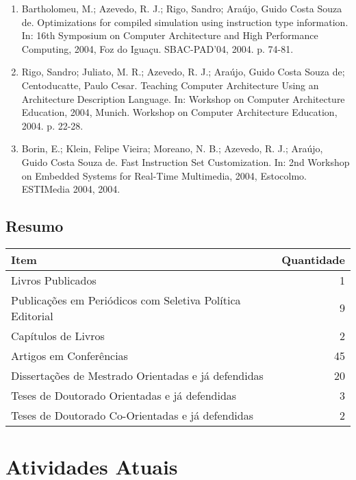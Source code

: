\documentclass[11pt]{article}
\begin{document}
\begin{enumerate}
\item Bartholomeu, M.; Azevedo, R. J.; Rigo, Sandro; Araújo, Guido
  Costa Souza de. Optimizations for compiled simulation using
  instruction type information. In: 16th Symposium on Computer
  Architecture and High Performance Computing, 2004, Foz do
  Iguaçu. SBAC-PAD'04, 2004. p. 74-81.

\item Rigo, Sandro; Juliato, M. R.; Azevedo, R. J.; Araújo, Guido
  Costa Souza de; Centoducatte, Paulo Cesar. Teaching Computer
  Architecture Using an Architecture Description Language. In:
  Workshop on Computer Architecture Education, 2004, Munich. Workshop
  on Computer Architecture Education, 2004. p. 22-28.
  
\item Borin, E.; Klein, Felipe Vieira; Moreano, N. B.; Azevedo, R. J.;
  Araújo, Guido Costa Souza de. Fast Instruction Set
  Customization. In: 2nd Workshop on Embedded Systems for Real-Time
  Multimedia, 2004, Estocolmo. ESTIMedia 2004, 2004.
 
\end{enumerate}

\subsection{Resumo}

\begin{table}[htbp]
  \centering
  \begin{tabular}{|l|r|}
\hline
Item & Quantidade \\ \hline \hline
Livros Publicados & 1 \\ \hline
Publicações em Periódicos com Seletiva Política Editorial & 9 \\
\hline
Capítulos de Livros & 2 \\ \hline
Artigos em Conferências & 45 \\ \hline
Dissertações de Mestrado Orientadas e já defendidas & 20 \\ \hline
Teses de Doutorado Orientadas e já defendidas & 3 \\ \hline
Teses de Doutorado Co-Orientadas e já defendidas & 2 \\ \hline

  \end{tabular}
  \label{tab:resumo}
\end{table}

\section{Atividades Atuais}
\end{document}
